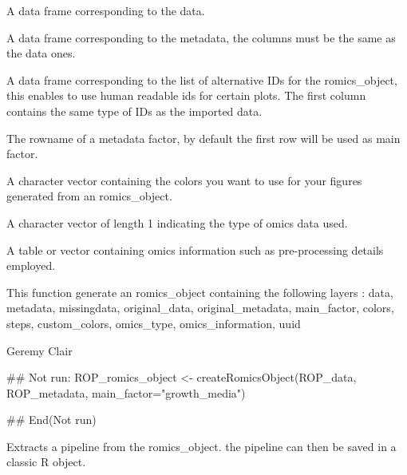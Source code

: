 \documentclass[a4paper]{book}
\begin{document}
\begin{Arguments}
\begin{ldescription}
\item[\code{data}] A data frame corresponding to the data.

\item[\code{metadata}] A data frame corresponding to the metadata, the columns must be the same as the data ones.

\item[\code{IDs}] A data frame corresponding to the list of alternative IDs for the romics\_object, this enables to use human readable ids for certain plots. The first column contains the same type of IDs as the imported data.

\item[\code{main\_factor}] The rowname of a metadata factor, by default the first row will be used as main factor.

\item[\code{custom\_colors}] A character vector containing the colors you want to use for your figures generated from an romics\_object.

\item[\code{omics\_type}] A character vector of length 1 indicating the type of omics data used.

\item[\code{omics\_information}] A table or vector containing omics information such as pre-processing details employed.
\end{ldescription}
\end{Arguments}
%
\begin{Value}
This function generate an romics\_object containing the following layers : data, metadata, missingdata, original\_data, original\_metadata, main\_factor, colors, steps, custom\_colors, omics\_type, omics\_information, uuid
\end{Value}
%
\begin{Author}
Geremy Clair
\end{Author}
%
\begin{Examples}
\begin{ExampleCode}
## Not run: 
ROP_romics_object <-
createRomicsObject(ROP_data, ROP_metadata, main_factor="growth_media")

## End(Not run)
\end{ExampleCode}
\end{Examples}
%
\begin{Description}
Extracts a pipeline from the romics\_object. the pipeline can then be saved in a classic R object.
\end{Description}
\end{document}
